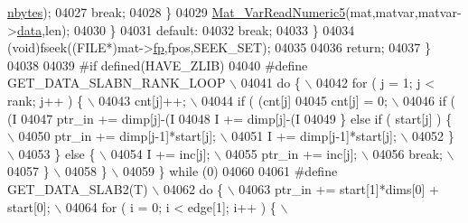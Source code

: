 \begin{DoxyCode}
{{{{{{{{{{{{{{{{{{{{{      \hyperlink{group___m_a_t_abf1c844540503be2df9bb3db93cfe307}{nbytes});
04027                     \textcolor{keywordflow}{break};
04028                 \}
04029                 \hyperlink{mat5_8c_ad4a2e875b830830f0ec3cd678c0c6230}{Mat\_VarReadNumeric5}(mat,matvar,matvar->\hyperlink{group___m_a_t_a5672978efa230bbdecdf38ede781f7fa}{data},len);
04030             \}
04031         \textcolor{keywordflow}{default}:
04032             \textcolor{keywordflow}{break};
04033     \}
04034     (void)fseek((FILE*)mat->\hyperlink{struct__mat__t_a85f562e407ca9ad4d2a6e14f839432b7}{fp},fpos,SEEK\_SET);
04035 
04036     \textcolor{keywordflow}{return};
04037 \}
04038 
04039 \textcolor{preprocessor}{#if defined(HAVE\_ZLIB)}
04040 \textcolor{preprocessor}{#define GET\_DATA\_SLABN\_RANK\_LOOP \(\backslash\)}
04041 \textcolor{preprocessor}{    do \{ \(\backslash\)}
04042 \textcolor{preprocessor}{        for ( j = 1; j < rank; j++ ) \{ \(\backslash\)}
04043 \textcolor{preprocessor}{            cnt[j]++; \(\backslash\)}
04044 \textcolor{preprocessor}{            if ( (cnt[j] %
04045 \textcolor{preprocessor}{                cnt[j] = 0; \(\backslash\)}
04046 \textcolor{preprocessor}{                if ( (I %
04047 \textcolor{preprocessor}{                    ptr\_in += dimp[j]-(I %
04048 \textcolor{preprocessor}{                    I += dimp[j]-(I %
04049 \textcolor{preprocessor}{                \} else if ( start[j] ) \{ \(\backslash\)}
04050 \textcolor{preprocessor}{                    ptr\_in += dimp[j-1]*start[j]; \(\backslash\)}
04051 \textcolor{preprocessor}{                    I += dimp[j-1]*start[j]; \(\backslash\)}
04052 \textcolor{preprocessor}{                \} \(\backslash\)}
04053 \textcolor{preprocessor}{            \} else \{ \(\backslash\)}
04054 \textcolor{preprocessor}{                I += inc[j]; \(\backslash\)}
04055 \textcolor{preprocessor}{                ptr\_in += inc[j]; \(\backslash\)}
04056 \textcolor{preprocessor}{                break; \(\backslash\)}
04057 \textcolor{preprocessor}{            \} \(\backslash\)}
04058 \textcolor{preprocessor}{        \} \(\backslash\)}
04059 \textcolor{preprocessor}{    \} while (0)}
04060 
04061 \textcolor{preprocessor}{#define GET\_DATA\_SLAB2(T) \(\backslash\)}
04062 \textcolor{preprocessor}{    do \{ \(\backslash\)}
04063 \textcolor{preprocessor}{        ptr\_in += start[1]*dims[0] + start[0]; \(\backslash\)}
04064 \textcolor{preprocessor}{        for ( i = 0; i < edge[1]; i++ ) \{ \(\backslash\)}
}}}}}}}}}}}}}}}}}}}}}}}}}
\end{DoxyCode}
